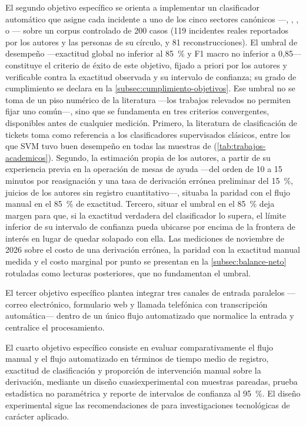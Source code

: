 El segundo objetivo específico se orienta a implementar un clasificador automático que asigne cada incidente a uno de los cinco sectores canónicos ---, , ,  o --- sobre un corpus controlado de 200 casos (119 incidentes reales reportados por los autores y las personas de su círculo, y 81 reconstrucciones). El umbral de desempeño ---exactitud global no inferior al 85~\% y F1 macro no inferior a 0,85--- constituye el criterio de éxito de este objetivo, fijado a priori por los autores y verificable contra la exactitud observada y su intervalo de confianza; su grado de cumplimiento se declara en la \autoref{subsec:cumplimiento-objetivos}. Ese umbral no se toma de un piso numérico de la literatura ---los trabajos relevados no permiten fijar uno común---, sino que se fundamenta en tres criterios convergentes, disponibles antes de cualquier medición. Primero, la literatura de clasificación de tickets toma como referencia a los clasificadores supervisados clásicos, entre los que SVM tuvo buen desempeño en todas las muestras de \textcite{Paramesh2019_it_service_desk} (\autoref{tab:trabajos-academicos}). Segundo, la estimación propia de los autores, a partir de su experiencia previa en la operación de mesas de ayuda ---del orden de 10 a 15 minutos por reasignación y una tasa de derivación errónea preliminar del 15~\%, juicios de los autores sin registro cuantitativo---, situaba la paridad con el flujo manual en el 85~\% de exactitud. Tercero, situar el umbral en el 85~\% deja margen para que, si la exactitud verdadera del clasificador lo supera, el límite inferior de su intervalo de confianza pueda ubicarse por encima de la frontera de interés en lugar de quedar solapado con ella. Las mediciones de noviembre de 2026 sobre el costo de una derivación errónea, la paridad con la exactitud manual medida y el costo marginal por punto se presentan en la \autoref{subsec:balance-neto} rotuladas como lecturas posteriores, que no fundamentan el umbral.

El tercer objetivo específico plantea integrar tres canales de entrada paralelos ---correo electrónico, formulario web y llamada telefónica con transcripción automática--- dentro de un único flujo automatizado que normalice la entrada y centralice el procesamiento.

El cuarto objetivo específico consiste en evaluar comparativamente el flujo manual y el flujo automatizado en términos de tiempo medio de registro, exactitud de clasificación y proporción de intervención manual sobre la derivación, mediante un diseño cuasiexperimental con muestras pareadas, prueba estadística no paramétrica y reporte de intervalos de confianza al 95~\%. El diseño experimental sigue las recomendaciones de \textcite{HernandezSampieri2018_metodologia} para investigaciones tecnológicas de carácter aplicado.

